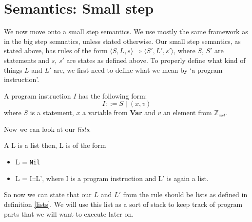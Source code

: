 \section{Semantics: Small step}
We now move onto a small step semantics. We use mostly the same framework as in the big step semnatics, unless stated otherwise. Our small step semantics, as stated above, has rules of the form $\langle S, L, s \rangle \Rightarrow \langle S', L', s' \rangle$, where $S$, $S'$ are statements and $s$, $s'$ are states as defined above. To properly define what kind of things $L$ and $L'$ are, we first need to define what we mean by `a program instruction'. 

\begin{definition}
A program instruction $I$ has the following form:
$$I ::= S \mid (x,v)$$
where $S$ is a statement, $x$ a variable from \textbf{Var} and $v$ an element from $\mathbb{Z}_{ext}$.
\end{definition}

Now we can look at our \emph{lists}:

\begin{definition}
\label{lists}
A L is a list then, L is of the form 
\begin{itemize}[noitemsep]
    \item L = \texttt{Nil}
    \item L = I::L', where I is a program instruction and L' is again a list. 
\end{itemize}
\end{definition}

So now we can state that our $L$ and $L'$ from the rule should be lists as defined in definition \ref{lists}. We will use this list as a sort of stack to keep track of program parts that we will want to execute later on. 

